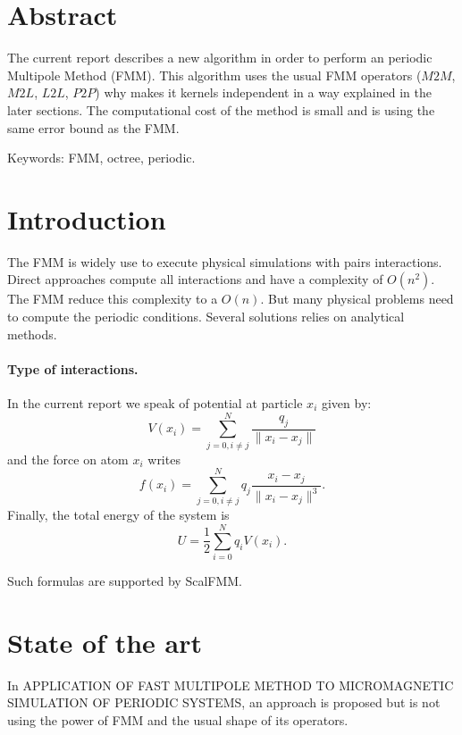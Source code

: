 \documentclass[12pt]{article} %
\begin{document}
\tableofcontents %

\newpage %

\section{Abstract}

The current report describes a new algorithm in order to perform an periodic Multipole Method (FMM).
This algorithm uses the usual FMM operators ($M2M$, $M2L$, $L2L$, $P2P$) why makes it kernels independent in a way explained in the later sections.
The computational cost of the method is small and is using the same error bound as the FMM.

Keywords: FMM, octree, periodic.

\section{Introduction}
The FMM is widely use to execute physical simulations with pairs interactions.
Direct approaches compute all interactions and have a complexity of $O(n^2)$.
The FMM reduce this complexity to a $O(n)$.
But many physical problems need to compute the periodic conditions.
Several solutions relies on analytical methods.

\paragraph{Type of interactions.}

In the current report we speak of potential at particle $x_i$ given by:
$$
V(x_i) = \sum_{j=0,i\neq j}^{N}{\frac{q_j}{\|x_i-x_j\|}}
$$ 
and the force on atom $x_i$ writes
$$
f(x_i) =  \sum_{j=0,i\neq j}^{N}{q_j\frac{x_i-x_j}{\|x_i-x_j\|^3}}.
$$
Finally, the total energy of the system is
$$
U = \frac{1}{2}\sum_{i=0}^{N}{q_i V(x_i)}.
$$ 

Such formulas are supported by ScalFMM.

\section{State of the art}

In APPLICATION OF FAST MULTIPOLE METHOD TO MICROMAGNETIC SIMULATION OF PERIODIC SYSTEMS, an approach is proposed but
is not using the power of FMM and the usual shape of its operators.
\end{document}
